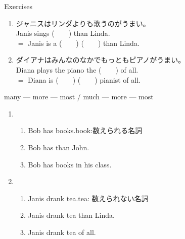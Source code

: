 \documentclass[aspectratio=169,xcolor={dvipsnames,table}]{beamer}
\begin{document}
\begin{frame}[plain]{Exercises}
\begin{enumerate}
 \item ジャニスはリンダよりも歌うのがうまい。\\
       Janis sings (~~~~) than Linda.\\
       $=$\,\,Janis is a  (~~~~)  (~~~~) than Linda.
 \item ダイアナはみんなのなかでもっともピアノがうまい。\\
       Diana plays the piano the (~~~~) of all.\\
       $=$\,\,Diana is (~~~~)  (~~~~) pianist of all.
\end{enumerate}
\end{frame}
\begin{frame}[plain]{many --- more --- most / much --- more --- most}
 \begin{enumerate}
  \item \begin{enumerate}
	 \item<1-> Bob has  books.\hfill{\scriptsize book:数えられる名詞}
	 \item<2-> Bob has  than John.
	 \item<3-> Bob has  books in his class.
	\end{enumerate}
  \item \begin{enumerate}
	 \item<4-> Janis drank  tea.\hfill{\scriptsize tea: 数えられない名詞}
	 \item<5-> Janis drank  tea than Linda.
	 \item<6-> Janis drank  tea of all. 

	\end{enumerate}
 \end{enumerate}

\end{frame}
\end{document}

